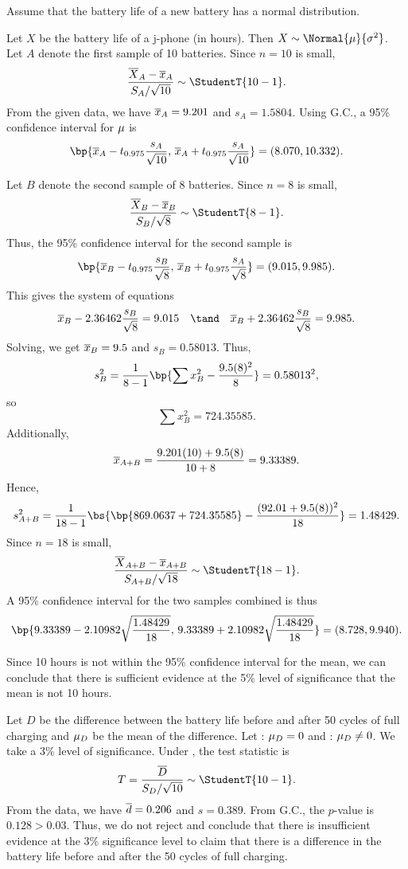 \begin{solution}
    \begin{ppart}
        Assume that the battery life of a new battery has a normal distribution.

        Let $X$ be the battery life of a j-phone (in hours). Then $X \sim \Normal{\m}{\s^2}$. Let $A$ denote the first sample of 10 batteries. Since $n = 10$ is small, \[\frac{\ol{X}_A - \ol{x}_A}{S_A / \sqrt{10}} \sim \StudentT{10-1}.\] From the given data, we have $\overline{x}_A = 9.201$ and $s_A = 1.5804$. Using G.C., a 95\% confidence interval for $\mu$ is \[\bp{\ol{x}_A - t_{0.975} \frac{s_A}{\sqrt{10}}, \, \ol{x}_A + t_{0.975} \frac{s_A}{\sqrt{10}}} = (8.070, 10.332).\]
    \end{ppart}
    \begin{ppart}
        Let $B$ denote the second sample of 8 batteries. Since $n = 8$ is small, \[\frac{\ol{X}_B - \ol{x}_B}{S_B / \sqrt{8}} \sim \StudentT{8-1}.\] Thus, the 95\% confidence interval for the second sample is \[\bp{\ol{x}_B - t_{0.975} \frac{s_B}{\sqrt{8}}, \, \ol{x}_B + t_{0.975} \frac{s_A}{\sqrt{8}}} = (9.015, 9.985).\] This gives the system of equations \[\ol{x}_B - 2.36462 \frac{s_B}{\sqrt{8}} = 9.015 \quad \tand \quad \ol{x}_B + 2.36462 \frac{s_B}{\sqrt{8}} = 9.985.\] Solving, we get $\overline{x}_B = 9.5$ and $s_B = 0.58013$. Thus, \[s_B^2 = \frac1{8-1} \bp{\sum x_B^2 - \frac{9.5(8)^2}{8}} = 0.58013^2,\] so \[\sum x_B^2 = 724.35585.\] Additionally, \[\overline{x}_{A + B} = \frac{9.201(10) + 9.5(8)}{10 + 8} = 9.33389.\] Hence, \[s^2_{A+B} = \frac1{18-1} \bs{\bp{869.0637 + 724.35585} - \frac{(92.01 + 9.5(8))^2}{18}} = 1.48429.\] Since $n = 18$ is small, \[\frac{\ol{X}_{A+B} - \ol{x}_{A+B}}{S_{A+B} / \sqrt{18}} \sim \StudentT{18-1}.\] A 95\% confidence interval for the two samples combined is thus \[\bp{9.33389 - 2.10982 \sqrt{\frac{1.48429}{18}}, \, 9.33389 + 2.10982 \sqrt{\frac{1.48429}{18}}} = (8.728, 9.940).\]
    \end{ppart}
    \begin{ppart}
        Since 10 hours is not within the 95\% confidence interval for the mean, we can conclude that there is sufficient evidence at the 5\% level of significance that the mean is not 10 hours.
    \end{ppart}
    \begin{ppart}
        Let $D$ be the difference between the battery life before and after 50 cycles of full charging and $\mu_D$ be the mean of the difference. Let \nullhyp: $\mu_D = 0$ and \althyp: $\mu_D \neq 0$. We take a 3\% level of significance. Under \nullhyp, the test statistic is \[T = \frac{\ol{D}}{S_D / \sqrt{10}} \sim \StudentT{10-1}.\] From the data, we have $\overline{d} = 0.206$ and $s = 0.389$. From G.C., the $p$-value is $0.128 > 0.03$. Thus, we do not reject \nullhyp{} and conclude that there is insufficient evidence at the 3\% significance level to claim that there is a difference in the battery life before and after the 50 cycles of full charging.
    \end{ppart}
\end{solution}